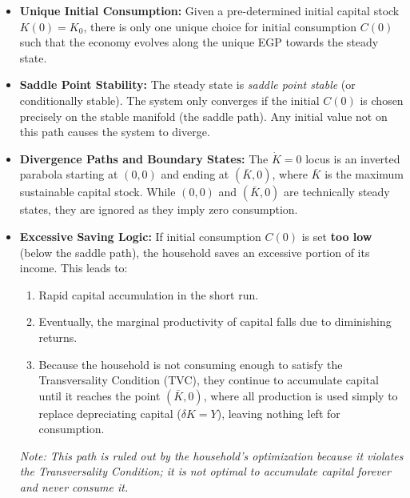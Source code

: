 \begin{itemize}
    \item \textbf{Unique Initial Consumption:} Given a pre-determined initial capital stock $K(0) = K_0$, there is only one unique choice for initial consumption $C(0)$ such that the economy evolves along the unique EGP towards the steady state.
    \item \textbf{Saddle Point Stability:} The steady state is \textit{saddle point stable} (or conditionally stable). The system only converges if the initial $C(0)$ is chosen precisely on the stable manifold (the saddle path). Any initial value not on this path causes the system to diverge.
    \item \textbf{Divergence Paths and Boundary States:} The $\dot{K}=0$ locus is an inverted parabola starting at $(0,0)$ and ending at $(\bar{K}, 0)$, where $\bar{K}$ is the maximum sustainable capital stock. While $(0,0)$ and $(\bar{K},0)$ are technically steady states, they are ignored as they imply zero consumption.
    \item \textbf{Excessive Saving Logic:} If initial consumption $C(0)$ is set \textbf{too low} (below the saddle path), the household saves an excessive portion of its income. This leads to:
    \begin{enumerate}
        \item Rapid capital accumulation in the short run.
        \item Eventually, the marginal productivity of capital falls due to diminishing returns.
        \item Because the household is not consuming enough to satisfy the Transversality Condition (TVC), they continue to accumulate capital until it reaches the point $(\bar{K}, 0)$, where all production is used simply to replace depreciating capital ($\delta K = Y$), leaving nothing left for consumption. 
    \end{enumerate}
    \textit{Note: This path is ruled out by the household's optimization because it violates the Transversality Condition; it is not optimal to accumulate capital forever and never consume it.}
\end{itemize}
